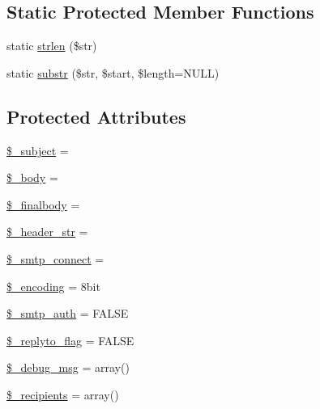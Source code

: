 \subsection*{Static Protected Member Functions}
\begin{DoxyCompactItemize}
\item 
static \mbox{\hyperlink{class_c_i___email_a4c29a687d4ed62c26a10e41d98930d5f}{strlen}} (\$str)
\item 
static \mbox{\hyperlink{class_c_i___email_a101caef57ef0b165da5747e2c2e6c9dc}{substr}} (\$str, \$start, \$length=N\+U\+LL)
\end{DoxyCompactItemize}
\subsection*{Protected Attributes}
\begin{DoxyCompactItemize}
\item 
\mbox{\hyperlink{class_c_i___email_a3a212566602bb9c1c34e7619390b1bb8}{\$\+\_\+subject}} = \textquotesingle{}\textquotesingle{}
\item 
\mbox{\hyperlink{class_c_i___email_a2428d6733045fa7c07e5f61c8c85b8c9}{\$\+\_\+body}} = \textquotesingle{}\textquotesingle{}
\item 
\mbox{\hyperlink{class_c_i___email_afe3b263ee6d58805f3c06ef1fdc863a5}{\$\+\_\+finalbody}} = \textquotesingle{}\textquotesingle{}
\item 
\mbox{\hyperlink{class_c_i___email_a551b64b005666b98b001ed7ff405047c}{\$\+\_\+header\+\_\+str}} = \textquotesingle{}\textquotesingle{}
\item 
\mbox{\hyperlink{class_c_i___email_ab15af26ecd0970be1fb7609d06eec5ba}{\$\+\_\+smtp\+\_\+connect}} = \textquotesingle{}\textquotesingle{}
\item 
\mbox{\hyperlink{class_c_i___email_a37d569dfb47810a72ca1cfc5095ad149}{\$\+\_\+encoding}} = \textquotesingle{}8bit\textquotesingle{}
\item 
\mbox{\hyperlink{class_c_i___email_a9b977d5970ceedb6cba44032a9976459}{\$\+\_\+smtp\+\_\+auth}} = F\+A\+L\+SE
\item 
\mbox{\hyperlink{class_c_i___email_a00e8e2c2c72e6acf2cd91a8c4498695a}{\$\+\_\+replyto\+\_\+flag}} = F\+A\+L\+SE
\item 
\mbox{\hyperlink{class_c_i___email_a23c65b604c773811f76e75093fe9a77b}{\$\+\_\+debug\+\_\+msg}} = array()
\item 
\mbox{\hyperlink{class_c_i___email_aa5f5e78dd9477bdec18b4aadae77ba13}{\$\+\_\+recipients}} = array()
\item 

\end{DoxyCompactItemize}
